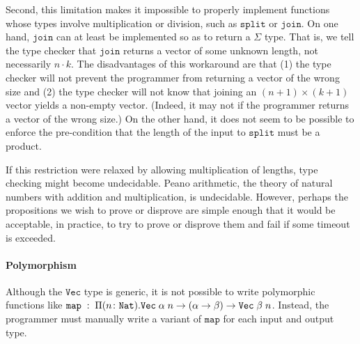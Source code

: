 \documentclass[acmsmall,nonacm]{acmart}
\begin{document}
Second, this limitation makes it impossible to properly implement functions whose types involve multiplication or division, such as $\texttt{split}$ or $\texttt{join}$.
On one hand, $\texttt{join}$ can at least be implemented so as to return a $\Sigma$ type.
That is, we tell the type checker that $\texttt{join}$ returns a vector of some unknown length, not necessarily $n \cdot k$.
The disadvantages of this workaround are that (1) the type checker will not prevent the programmer from returning a vector of the wrong size and (2) the type checker will not know that joining an $(n + 1) \times (k + 1)$ vector yields a non-empty vector.
(Indeed, it may not if the programmer returns a vector of the wrong size.)
On the other hand, it does not seem to be possible to enforce the pre-condition that the length of the input to $\texttt{split}$ must be a product.

If this restriction were relaxed by allowing multiplication of lengths, type checking might become undecidable.
Peano arithmetic, the theory of natural numbers with addition and multiplication, is undecidable.
However, perhaps the propositions we wish to prove or disprove are simple enough that it would be acceptable, in practice, to try to prove or disprove them and fail if some timeout is exceeded.

\paragraph{Polymorphism}
Although the $\texttt{Vec}$ type is generic, it is not possible to write polymorphic functions like $\texttt{map} \; : \; \Pi (n \colon \texttt{Nat}) . \texttt{Vec} \; \alpha \; n \rightarrow (\alpha \rightarrow \beta) \rightarrow \texttt{Vec} \; \beta \; n$.
Instead, the programmer must manually write a variant of $\texttt{map}$ for each input and output type.
\end{document}
